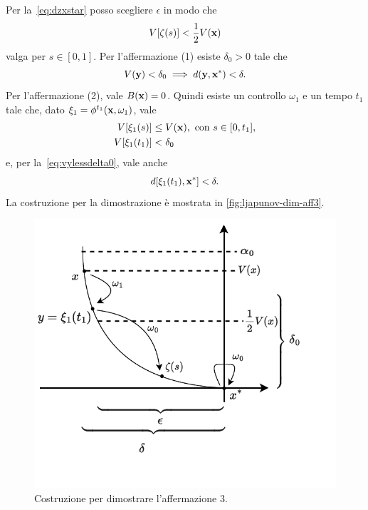 \begin{steps}
    Per la~\eqref{eq:dzxstar} posso scegliere $\epsilon$ in modo che
    \begin{equation*}
        V[\zeta(s)] < \frac 1 2 V(\mathbf{x})
    \end{equation*}
    valga per $s \in [0, 1]$.
    Per l'affermazione (1) esiste $\delta_0 > 0$ tale che
    \begin{equation}
        V(\mathbf{y}) < \delta_0 \implies d(\mathbf{y}, \mathbf{x}^*) < \delta.
        \label{eq:vylessdelta0}
    \end{equation}
    Per l'affermazione (2), vale $B(\mathbf{x}) = 0$.
    Quindi esiste un controllo $\omega_1$ e un tempo $t_1$ tale
    che, dato $\xi_1 = \phi^{t_1}(\mathbf{x}, \omega_1)$, vale
    \begin{align*}
        V[\xi_1(s)] &\leq V(\mathbf{x}), \text{ con } s \in [0, t_1],\\
        V[\xi_1(t_1)] &< \delta_0
    \end{align*}
    e, per la~\eqref{eq:vylessdelta0}, vale anche
    \begin{equation*}
        d[\xi_1(t_1), \mathbf{x}^*] < \delta.
    \end{equation*}
    La costruzione per la dimostrazione è mostrata in \autoref{fig:ljapunov-dim-aff3}.

    \hfill
    \begin{minipage}{.8\textwidth}
        \begin{figure}[H]
            \centering
            \includegraphics[width=.8\textwidth]{assets/ljapunov-dim-aff3}
            \caption[Costruzione 3 per teorema di Ljapunov]{Costruzione per dimostrare
            l'affermazione 3.}
            \label{fig:ljapunov-dim-aff3}
        \end{figure}
    \end{minipage}


\end{steps}
